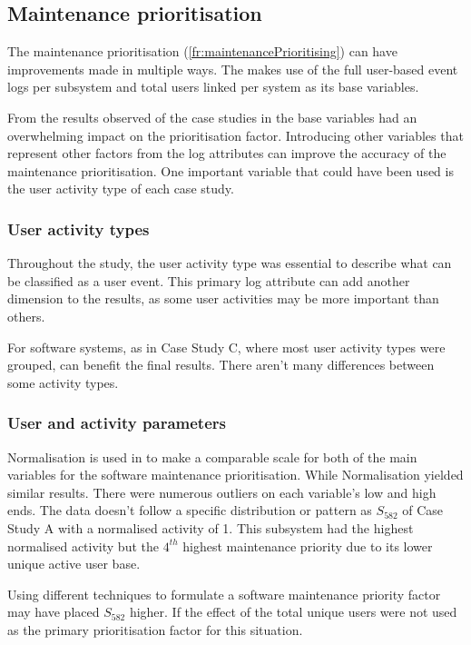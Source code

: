 \subsection{Maintenance prioritisation}
The maintenance prioritisation (\ref{fr:maintenancePrioritising}) can have improvements made in multiple ways. The  makes use of the full user-based event logs per subsystem and total users linked per system as its base variables.\par From the results observed of the case studies in  the base variables had an overwhelming impact on the prioritisation factor. Introducing other variables that represent other factors from the log attributes can improve the accuracy of the maintenance prioritisation. One important variable that could have been used is the user activity type of each case study.

\subsubsection{User activity types}
Throughout the study, the user activity type was essential to describe what can be classified as a user event. This primary log attribute can add another dimension to the results, as some user activities may be more important than others. \par For software systems, as in Case Study C, where most user activity types were grouped, can benefit the final results. There aren't many differences between some activity types. 

\subsubsection{User and activity parameters}
\par Normalisation is used in  to make a comparable scale for both of the main variables for the software maintenance prioritisation. While Normalisation yielded similar results. There were numerous outliers on each variable's low and high ends. The data doesn't follow a specific distribution or pattern as $S_{582}$ of Case Study A with a normalised activity of 1. This subsystem had the highest normalised activity but the $4^{th}$ highest maintenance priority due to its lower unique active user base.\par Using different techniques to formulate a software maintenance priority factor may have placed $S_{582}$ higher. If the effect of the total unique users were not used as the primary prioritisation factor for this situation. 

